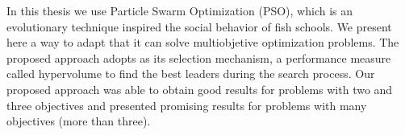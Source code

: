   In this thesis we use Particle Swarm Optimization (PSO), which is an evolutionary technique inspired \DIFdelbegin {}\DIFdelend \DIFaddbegin {}\DIFaddend the social 
  behavior of fish schools. We present here a way to adapt \DIFdelbegin {}\DIFdelend \DIFaddbegin {}\DIFaddend that it can solve multiobjetive optimization problems.
  The proposed approach adopts as its selection mechanism, a performance measure called hypervolume to find the best leaders
  during the search process. Our proposed approach was able to obtain good results for problems with two and three 
  objectives and presented promising results for problems with many objectives (more than three).